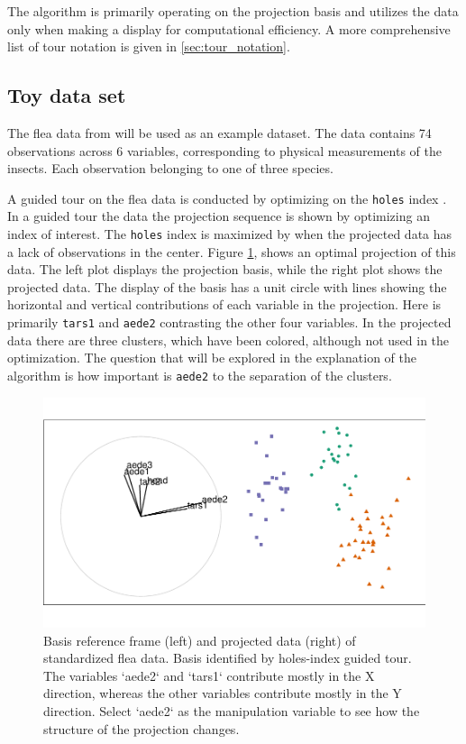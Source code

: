 \documentclass{monashthesis}
\begin{document}
The algorithm is primarily operating on the projection basis and
utilizes the data only when making a display for computational
efficiency. A more comprehensive list of tour notation is given in
\ref{sec:tour_notation}.

\subsection{Toy data set}\label{toy-data-set}

The flea data from \textcite{lubischew_use_1962} will be used as an
example dataset. The data contains 74 observations across 6 variables,
corresponding to physical measurements of the insects. Each observation
belonging to one of three species.

A guided tour on the flea data is conducted by optimizing on the
\texttt{holes} index \autocite{cook_interactive_2007}. In a guided tour
the data the projection sequence is shown by optimizing an index of
interest. The \texttt{holes} index is maximized by when the projected
data has a lack of observations in the center. Figure \ref{fig:step0},
shows an optimal projection of this data. The left plot displays the
projection basis, while the right plot shows the projected data. The
display of the basis has a unit circle with lines showing the horizontal
and vertical contributions of each variable in the projection. Here is
primarily \texttt{tars1} and \texttt{aede2} contrasting the other four
variables. In the projected data there are three clusters, which have
been colored, although not used in the optimization. The question that
will be explored in the explanation of the algorithm is how important is
\texttt{aede2} to the separation of the clusters.

\begin{figure}

{\centering \includegraphics[width=0.98\linewidth]{thesis_files/figure-latex/step0-1} 

}

\caption{Basis reference frame (left) and projected data (right) of standardized flea data. Basis identified by holes-index guided tour. The variables `aede2` and `tars1` contribute mostly in the X direction, whereas the other variables contribute mostly in the Y direction. Select `aede2` as the manipulation variable to see how the structure of the projection changes.}\label{fig:step0}
\end{figure}
\end{document}
